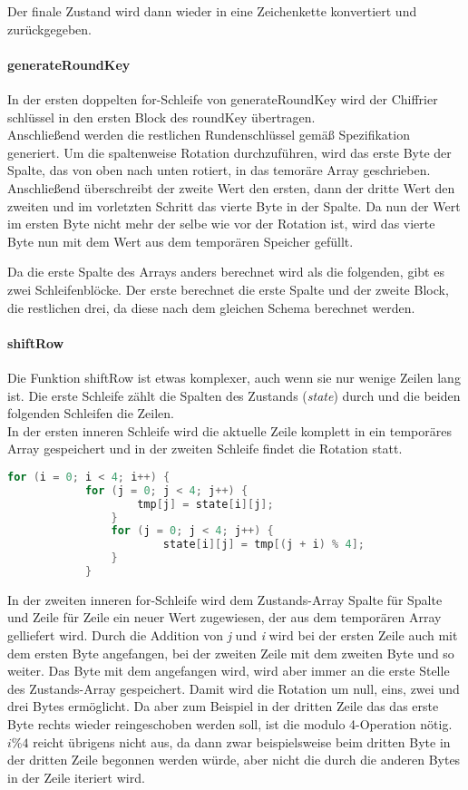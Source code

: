 		Der finale Zustand wird dann wieder in eine Zeichenkette konvertiert und
		zurückgegeben.

		\paragraph{generateRoundKey}
		In der ersten doppelten for-Schleife von generateRoundKey wird der Chiffrier\-
		schlüssel in den ersten Block des roundKey übertragen. \\
		Anschließend werden die restlichen Rundenschlüssel gemäß Spezifikation generiert.
		Um die spaltenweise Rotation durchzuführen, wird das erste Byte der Spalte, das von
		oben nach unten rotiert, in das temoräre Array geschrieben. Anschließend
		überschreibt der zweite Wert den ersten, dann der dritte Wert den zweiten und im
		vorletzten Schritt das vierte Byte in der Spalte. Da nun der Wert im ersten Byte
		nicht mehr der selbe wie vor der Rotation ist, wird das vierte Byte nun mit dem
		Wert aus dem temporären Speicher gefüllt.

		Da die erste Spalte des Arrays anders berechnet wird als die folgenden, gibt es
		zwei Schleifenblöcke. Der erste berechnet die erste Spalte und der zweite Block,
		die restlichen drei, da diese nach dem gleichen Schema berechnet werden.

		\paragraph{shiftRow}
		Die Funktion shiftRow ist etwas komplexer, auch wenn sie nur wenige Zeilen lang ist.
		Die erste Schleife zählt die Spalten des Zustands (\emph{state}) durch und die
		beiden folgenden Schleifen die Zeilen. \\
		In der ersten inneren Schleife wird die aktuelle Zeile komplett in ein temporäres
		Array gespeichert und in der zweiten Schleife findet die Rotation statt.

		\begin{lstlisting}[language=C]
		for (i = 0; i < 4; i++) {
			for (j = 0; j < 4; j++) {
		        	tmp[j] = state[i][j];
		        }
	        	for (j = 0; j < 4; j++) {
	            		state[i][j] = tmp[(j + i) % 4];
	        	}
    		}
		\end{lstlisting}

		In der zweiten inneren for-Schleife wird dem Zustands-Array Spalte für Spalte und
		Zeile für Zeile ein neuer Wert zugewiesen, der aus dem temporären Array gelliefert
		wird. Durch die Addition von \emph{j} und \emph{i} wird bei der ersten Zeile auch
		mit dem ersten Byte angefangen, bei der zweiten Zeile mit dem zweiten Byte und so
		weiter. Das Byte mit dem angefangen wird, wird aber immer an die erste Stelle des
		Zustands-Array gespeichert. Damit wird die Rotation um null, eins, zwei und drei
		Bytes ermöglicht. Da aber zum Beispiel in der dritten Zeile das
		das erste Byte rechts wieder reingeschoben werden soll, ist die modulo 4-Operation
		nötig. \\
		$i \% 4$ reicht übrigens nicht aus, da dann zwar beispielsweise beim dritten Byte
		in der dritten Zeile begonnen werden würde, aber nicht die durch die
		anderen Bytes in der Zeile iteriert wird. 

